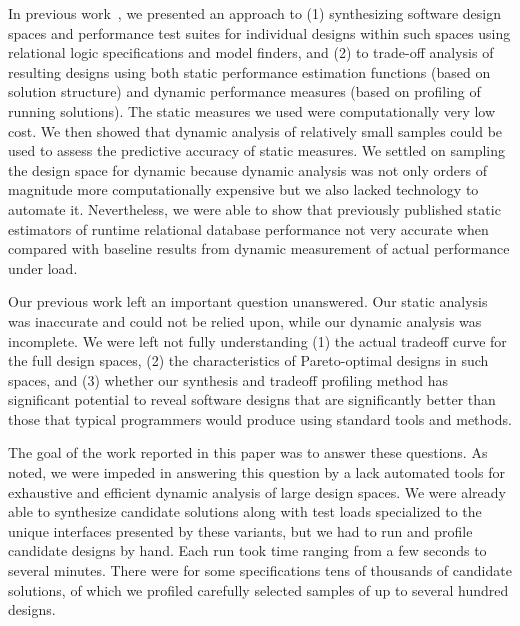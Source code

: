 In previous work~\cite{trademaker}, we presented an approach to (1) synthesizing software design spaces and performance test suites for individual designs within such spaces using relational logic specifications and model finders, and (2) to trade-off analysis of resulting designs using both static performance estimation functions (based on solution structure) and dynamic performance measures (based on profiling of running solutions). The static measures we used were computationally very low cost. We then showed that dynamic analysis of relatively small samples could be used to assess the predictive accuracy of static measures. We settled on sampling the design space for dynamic because dynamic analysis was not only orders of magnitude more computationally expensive but we also lacked technology to automate it. Nevertheless, we were able to show that previously published static estimators of runtime relational database performance not very accurate when compared with baseline results from dynamic measurement of actual performance under load.

Our previous work left an important question unanswered. Our static analysis was inaccurate and could not be relied upon, while our dynamic analysis was incomplete. We were left not fully understanding (1) the actual tradeoff curve for the full design spaces, (2) the characteristics of Pareto-optimal designs in such spaces, and (3) whether our synthesis and tradeoff profiling method has significant potential to reveal software designs that are significantly better than those that typical programmers would produce using standard tools and methods.

The goal of the work reported in this paper was to answer these questions. As noted, we were impeded in answering this question by a lack automated tools for exhaustive and efficient dynamic analysis of large design spaces. We were already able to synthesize candidate solutions along with test loads specialized to the unique interfaces presented by these variants, but we had to run and profile candidate designs by hand. Each run took time ranging from a few seconds to several minutes. There were for some specifications tens of thousands of candidate solutions, of which we profiled carefully selected samples of up to several hundred designs.

